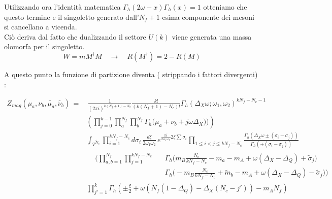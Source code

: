 \documentclass[a4paper,12pt]{article}
\begin{document}
Utilizzando ora l'identità matematica $ \Gamma_h ( 2 \omega - x  ) \Gamma_h ( x  ) =  1 $ otteniamo che questo termine e il singoletto generato dall'$N_f+1$-esima componente dei mesoni si cancellano a vicenda.\\
Ciò deriva dal fatto che dualizzando il settore $U(k)$ viene generata una massa olomorfa per il singoletto. 
\begin{equation}
	W = m M^{\dagger} M \quad \longrightarrow \quad R(M^{\dagger}) = 2 - R (M)
\end{equation}

A questo punto la funzione di partizione diventa ( strippando i fattori divergenti) :

\begin{align*}
Z_{mag} ( \mu_a , \nu_b , \tilde{\mu_a}, \tilde{\nu_b} ) \,= & \, \frac{1}{(2 \pi i )^{k(N_f+1) - N_c}}\frac{k!}{ (k(N_f+1) - N_c)! }
 \Gamma_h ( \Delta_X \omega ; \omega_1 , \omega_2)^{ k N_f - N_c -1}  \\
 &  \left( \prod_{j=0}^{k-1} 
\prod_a^{N_f } \prod_b^{N_f}  \Gamma_h \big( \mu_a+  \nu_b + j \omega \Delta_X) \big)  \right) \\
&\int_{T^{\tilde{N}_c}}  \prod_{i=1}^{ k N_f - N_c } d \sigma_i \, 
\frac{d \xi}{2 \omega_1 \omega_2} \, e^{ \frac{\pi i }{ 2 \omega_1 \omega_2} 2 \xi  \sum \sigma_i }  \prod_{ 1 \leq i<j \leq k N_f - N_c } \frac{ \Gamma_h( \Delta_X \omega \pm (\sigma_i - \sigma_j)) }{ \Gamma_h ( \pm (\sigma_i - \sigma_j) )} 
  \\&
\begin{aligned}
   &  \bigg( \prod_{a,b=1}^{N_f} \prod_{j=1}^{k N_f - N_c }  	
   && \Gamma_h \big( m_B \frac{N_c}{ k N_f-N_c} - m_a - m_A + \omega (\Delta_X - \Delta_Q)  + \tilde{\sigma}_j \big) \\
 & && \Gamma_h \big(  -m_B \frac{N_c}{k N_f-N_c} + \tilde{m}_b - m_A + \omega (\Delta_X - \Delta_Q)  - \tilde{\sigma}_j \big)  \bigg)
  \end{aligned}
  \\
  & \prod_{j'=1}^{k} \Gamma_h \left( \pm \frac{\xi}{2} +\omega \left( 
  N_f ( 1 - \Delta_Q ) - \Delta_X ( N_c - j')  \right) - m_A N_f 
 \right) 
\end{align*}
\newpage


\end{document}
